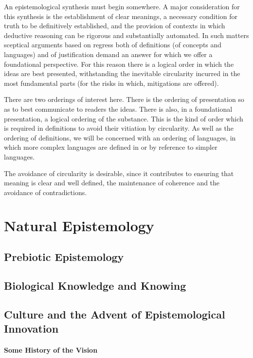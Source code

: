 \documentclass[10pt,titlepage]{book}
\begin{document}
An epistemological synthesis must begin somewhere.
A major consideration for this synthesis is the establishment of clear meanings, a necessary condition for truth to be definitively established, and the provision of contexts in which deductive reasoning can be rigorous and substantially automated.
In such matters sceptical arguments based on regress both of definitions (of concepts and languages) and of justification demand an answer for which we offer a foundational perspective.
For this reason there is a logical order in which the ideas are best presented, withstanding the inevitable circularity incurred in the most fundamental parts (for the risks in which, mitigations are offered).

There are two orderings of interest here.
There is the ordering of presentation so as to best communicate to readers the ideas.
There is also, in a foundational presentation, a logical ordering of the substance.
This is the kind of order which is required in definitions to avoid their vitiation by circularity.
As well as the ordering of definitions, we will be concerned with an ordering of languages, in which more complex languages are defined in or by reference to simpler languages.

The avoidance of circularity is desirable, since it contributes to ensuring that meaning is clear and well defined, the maintenance of coherence and the avoidance of contradictions.

\part{Natural Epistemology}

\chapter{Prebiotic Epistemology}

\chapter{Biological Knowledge and Knowing}

\chapter{Culture and the Advent of Epistemological Innovation}

\subsection{Some History of the Vision}
\end{document}
